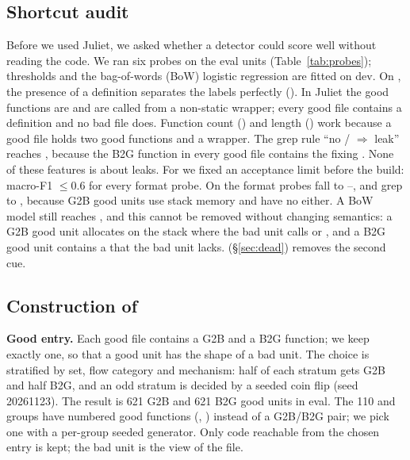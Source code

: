 \subsection{Shortcut audit}
\label{sec:audit}
Before we used Juliet, we asked whether a detector could score well without reading the code.
We ran six probes on the eval units (Table~\ref{tab:probes}); thresholds and the bag-of-words (BoW) logistic regression are fitted on dev.
On \Orig, the presence of a  definition separates the labels perfectly ().
In Juliet the good functions are  and are called from a non-static  wrapper; every good file contains a  definition and no bad file does. %
Function count () and length () work because a good file holds two good functions and a wrapper.
The grep rule ``no / $\Rightarrow$ leak'' reaches , because the B2G function in every good file contains the fixing .
None of these features is about leaks.
For \Deb{} we fixed an acceptance limit before the build: macro-F1 $\le 0.6$ for every format probe. %
On \Deb{} the format probes fall to --, and grep to , because G2B good units use stack memory and have no  either.
A BoW model still reaches , and this cannot be removed without changing semantics: a G2B good unit allocates on the stack where the bad unit calls  or , and a B2G good unit contains a  that the bad unit lacks.
\Dead{} (\S\ref{sec:dead}) removes the second cue.



\subsection{Construction of \Deb}
\label{sec:deb}
\noindent\textbf{Good entry.}
Each good file contains a G2B and a B2G function; we keep exactly one, so that a good unit has the shape of a bad unit.
The choice is stratified by set, flow category and mechanism: half of each stratum gets G2B and half B2G, and an odd stratum is decided by a seeded coin flip (seed 20261123). %
The result is 621 G2B and 621 B2G good units in eval. %
The 110  and  groups have numbered good functions (, ) instead of a G2B/B2G pair; we pick one with a per-group seeded generator. %
Only code reachable from the chosen entry is kept; the bad unit is the  view of the file.

